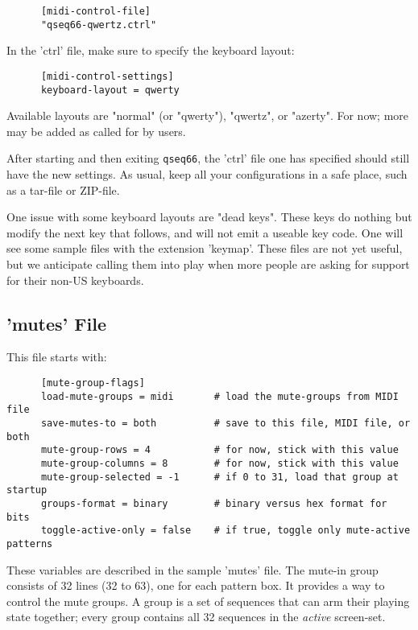    \begin{verbatim}
      [midi-control-file]
      "qseq66-qwertz.ctrl"
   \end{verbatim}

   In the 'ctrl' file, make sure to specify the keyboard layout:

   \begin{verbatim}
      [midi-control-settings]
      keyboard-layout = qwerty
   \end{verbatim}

   Available layouts are "normal" (or "qwerty"),
   "qwertz", or "azerty".  For now; more may be added as called for by users.

   After starting and then exiting \texttt{qseq66},
   the 'ctrl' file one has specified
   should still have the new settings.
   As usual, keep all your configurations in a safe place, such as a tar-file or
   ZIP-file.

   One issue with some keyboard layouts are "dead keys".  These keys do
   nothing but modify the next key that follows, and will not emit
   a useable key code.
   One will see some sample files with the extension 'keymap'.
   These files are not yet useful, but we anticipate calling them into play
   when more people are asking for support for their non-US keyboards.

\subsection{'mutes' File}
\label{subsubsec:configuration_mute_group_control}

   This file starts with:

   \begin{verbatim}
      [mute-group-flags]
      load-mute-groups = midi       # load the mute-groups from MIDI file
      save-mutes-to = both          # save to this file, MIDI file, or both
      mute-group-rows = 4           # for now, stick with this value
      mute-group-columns = 8        # for now, stick with this value
      mute-group-selected = -1      # if 0 to 31, load that group at startup
      groups-format = binary        # binary versus hex format for bits
      toggle-active-only = false    # if true, toggle only mute-active patterns
   \end{verbatim}

   These variables are described in the sample 'mutes' file.
   The mute-in group consists of 32 lines (32 to 63), one for each
   pattern box.
   It provides a way to control the mute groups.
   A group is a set of sequences that can arm their playing state
   together; every group contains all 32 sequences in the
   \textsl{active} screen-set.

